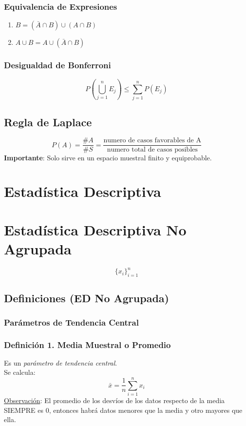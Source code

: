 \documentclass{article}
\newcommand{\sumatoria}[2]{\sum_{#1} ^{#2}}
\begin{document}
\subsubsection{Equivalencia de Expresiones}
\begin{enumerate}
    \item $B = (\bar{A} \cap B) \cup (A \cap B)$
    \item $A \cup B = A \cup (\bar{A} \cap B)$
\end{enumerate}

\subsubsection{Desigualdad de Bonferroni}
\begin{equation*}
    P(\bigcup^n_{j=1} E_j) \leq \sumatoria{j = 1}{n} P(E_j)
\end{equation*}

\subsection{Regla de Laplace}
\begin{equation*}
    P(A) = \frac{\#A}{\#S} = \frac{\text{numero de casos favorables de A}}{\text{numero total de casos posibles}}
\end{equation*}
\textbf{Importante}: Solo sirve en un espacio muestral finito y equiprobable.


\newpage
\section{Estadística Descriptiva}
\section*{Estadística Descriptiva No Agrupada}
\begin{equation*}
    \{x_i\}^n_{i=1}
\end{equation*}
\subsection{Definiciones (ED No Agrupada)}
\subsubsection{Parámetros de Tendencia Central}
\subsubsection*{Definición 1. Media Muestral o Promedio}
Es un \emph{parámetro de tendencia central}.
\\Se calcula:
\begin{equation*}
    \bar{x} = \frac{1}{n} \sumatoria{i=1}{n} x_i
\end{equation*}
\underline{Observación}: El promedio de los desvíos de los datos respecto de la media SIEMPRE es 0,
entonces habrá datos menores que la media y otro mayores que ella.
\end{document}

